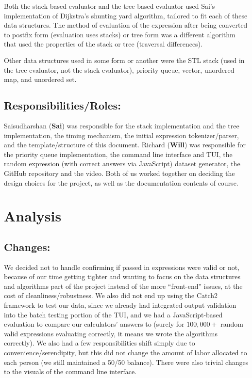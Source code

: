 \documentclass[11pt]{article}
\begin{document}
Both the stack based evaluator and the tree based evaluator used Sai's implementation of Dijkstra's shunting yard algorithm, tailored to fit each of these data structures.
The method of evaluation of the expression after being converted to postfix form (evaluation uses stacks) or tree form was a different algorithm that used the properties of the stack or tree (traversal differences).

Other data structures used in some form or another were the STL stack (used in the tree evaluator, not the stack evaluator), priority queue, vector, unordered map, and unordered set.

\subsection*{Responsibilities/Roles:}
Saisudharshan (\textbf{Sai}) was responsible for the stack implementation and the tree implementation, the timing mechanism, the initial expression tokenizer/parser, and the template/structure of this document.
Richard (\textbf{Will}) was responsible for the priority queue implementation, the command line interface and TUI, the random expression (with correct answers via JavaScript) dataset generator, the GitHub repository and the video.
Both of us worked together on deciding the design choices for the project, as well as the documentation contents of course.

\noindent\makebox[\linewidth]{\rule{19.1cm}{0.4pt}}

\section*{Analysis}

\subsection*{Changes:}
We decided not to handle confirming if passed in expressions were valid or not, because of our time getting tighter and wanting to focus on the data structures and algorithms part of the project instead of the more ``front-end'' issues, at the cost of cleanliness/robustness.
We also did not end up using the Catch2 framework to test our data, since we already had integrated output validation into the batch testing portion of the TUI, and we had a JavaScript-based evaluation to compare our calculators' answers to (surely for $100,000+$ random valid expressions evaluating correctly, it means we wrote the algorithms correctly).
We also had a few responsibilities shift simply due to convenience/serendipity, but this did not change the amount of labor allocated to each person (we still maintained a 50/50 balance).
There were also trivial changes to the visuals of the command line interface.
\end{document}
